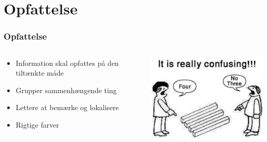 \documentclass{beamer}
\begin{document}
\section{Opfattelse}
\begin{frame}
  \frametitle{Opfattelse}
  \begin{columns}[T]
    \begin{column}{0.5\textwidth}
      \begin{itemize}
	    \item Information skal opfattes på den tiltænkte måde
	    \item Grupper sammenhængende ting
	    \item Lettere at bemærke og lokalisere
	    \item Rigtige farver
      \end{itemize}  
    \end{column}
    \begin{column}{.5\textwidth}
      \includegraphics[width=\textwidth]{opfattelse.jpg}
    \end{column}
  \end{columns}
\end{frame}
\end{document}

